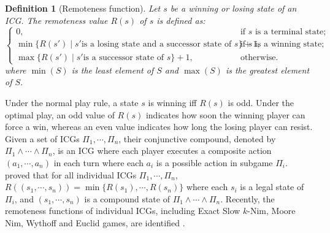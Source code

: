 \documentclass[review]{elsarticle}
\newcommand{\set}[1]{\{ #1 \}}
\newtheorem{definition}{Definition}
\begin{document}
\begin{definition}[Remoteness function] \rm \label{def:depth}
	Let $s$ be a winning or losing state of an ICG.
	The remoteness value $R(s)$ of $s$ is defined as: \\
		$\begin{cases}
			0, & \text{if } s \text{ is a terminal state}; \\
			
			\min \set{R(s') \mid s' \text{is a losing state and a successor state of } s} + 1, & \text{if } s \text{ is a winning state}; \\
			
			\max \set{R(s') \mid s' \text{is a successor state of } s} + 1, & \text{otherwise}. 
		\end{cases}$
	where $\min(S)$ is the least element of $S$ and $\max(S)$ is the greatest element of $S$.
\end{definition}
Under the normal play rule, a state $s$ is winning iff $R(s)$ is odd.
Under the optimal play, an odd value of $R(s)$ indicates how soon the winning player can force a win, whereas an even value indicates how long the losing player can resist.
Given a set of ICGs $\Pi_1, \cdots, \Pi_n$, their conjunctive compound, denoted by $\Pi_1 \land \cdots \land \Pi_n$, is an ICG where each player executes a composite action $(a_1, \cdots, a_n)$ in each turn where each $a_i$ is a possible action in subgame $\Pi_i$.
\citet{Smith1966} proved that for all individual ICGs $\Pi_1, \cdots, \Pi_n$, $R((s_1, \cdots, s_n)) = \min\set{R(s_1), \cdots, R(s_n)}$ where each $s_i$ is a legal state of $\Pi_i$, and $(s_1, \cdots, s_n)$ is a compound state of $\Pi_1 \land \cdots \land \Pi_n$.
Recently, the remoteness functions of individual ICGs, including Exact Slow $k$-Nim, Moore Nim, Wythoff and Euclid games, are identified \cite{GurMMV2024,BorGMV2024}.


\end{document}
